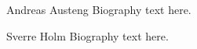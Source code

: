 \documentclass[journal]{IEEEtran}
\begin{document}


\begin{IEEEbiography}{Andreas Austeng}
Biography text here.
\end{IEEEbiography}

\begin{IEEEbiography}{Sverre Holm}
Biography text here.
\end{IEEEbiography}







\end{document}

